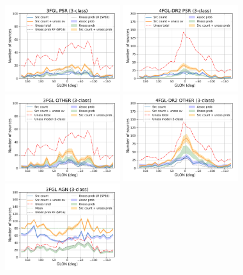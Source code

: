\begin{figure}[h]
\center
\includegraphics[width=0.45\textwidth]{plots/lon_profile_PSR_3FGL_3classes.pdf}
\includegraphics[width=0.45\textwidth]{plots/lon_profile_PSR_4FGL-DR2_3classes.pdf} \\
\includegraphics[width=0.45\textwidth]{plots/lon_profile_OTHER_3FGL_3classes.pdf}
\includegraphics[width=0.45\textwidth]{plots/lon_profile_OTHER_4FGL-DR2_3classes.pdf} \\
\includegraphics[width=0.45\textwidth]{plots/lon_profile_AGN_3FGL_3classes.pdf}

\end{figure}
